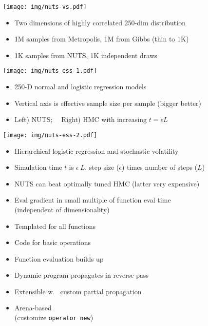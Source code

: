 \documentclass[10pt]{report}
\newcommand{\sld}[1]{\newpage{\noindent\LARGE \ \ \
    \textcolor{MidnightBlue}{\bfseries #1}}\vspace*{4pt}}
\newcommand{\code}[1]{{\tt #1}}
\newcommand{\myemph}[1]{{\color{MidnightBlue}{\bfseries #1}}}
\begin{document}
\texttt{[image: img/nuts-vs.pdf]}
\begin{itemize}
\item Two dimensions of highly correlated 250-dim distribution
\item 1M samples from Metropolis, 1M from Gibbs (thin to 1K)
\item 1K samples from NUTS, 1K independent draws
\end{itemize}

\sld{NUTS vs.\ Basic HMC}

\texttt{[image: img/nuts-ess-1.pdf]}
{\small
  \begin{itemize}
  \item 250-D normal and logistic regression models
  \item Vertical axis is effective sample size per sample (bigger better)
  \item Left) NUTS; \ \ Right) HMC with increasing $t = \epsilon L$
  \end{itemize}
}

\sld{NUTS vs.\ Basic HMC II}

\texttt{[image: img/nuts-ess-2.pdf]}

{\small
  \begin{itemize}
  \item Hierarchical logistic regression and stochastic volatility
  \item Simulation time $t$ is $\epsilon \ L$, step size ($\epsilon$)
    times number of steps ($L$)
  \item NUTS can beat optimally tuned HMC (latter very expensive)
  \end{itemize}
}


\sld{Reverse-Mode Auto Diff}
\begin{itemize}
\item Eval gradient in small multiple of function eval time
  \\
  {\footnotesize (independent of dimensionality)}
\item Templated \myemph{C++ overload} for all functions
\item Code \myemph{partial derivatives} for basic operations
\item Function evaluation builds up \myemph{expression tree}
\item Dynamic program propagates \myemph{chain rule} in reverse pass
\item Extensible w.\ \myemph{object-oriented} custom partial propagation
\item Arena-based \myemph{memory management}
  \\ {\footnotesize (customize \code{operator new})}
\end{itemize}
\end{document}
